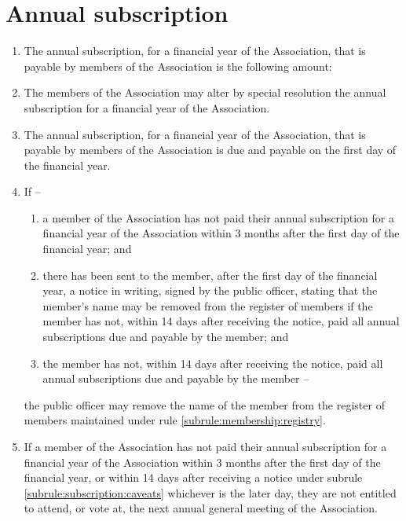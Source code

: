 \section{Annual subscription}
\label{rule:subscription}

\begin{enumerate}
	\item The annual subscription, for a financial year of the Association, that is payable by members of the Association is the following amount:\\\orgAnnualFee{}
	\item The members of the Association may alter by special resolution the annual subscription for a financial year of the Association.
	\item The annual subscription, for a financial year of the Association, that is payable by members of the Association is due and payable on the first day of the financial year.
	
	\item \label{subrule:subscription:caveats} If --
		\begin{enumerate}
			\item a member of the Association has not paid their annual subscription for a financial year of the Association within 3 months after the first day of the financial year; and
			\item there has been sent to the member, after the first day of the financial year, a notice in writing, signed by the public officer, stating that the member's name may be removed from the register of members if the member has not, within 14 days after receiving the notice, paid all annual subscriptions due and payable by the member; and
			\item the member has not, within 14 days after receiving the notice, paid all annual subscriptions due and payable by the member --
		\end{enumerate}	the public officer may remove the name of the member from the register of members maintained under rule \ref{subrule:membership:registry}.

	\item If a member of the Association has not paid their annual subscription for a financial year of the Association within 3 months after the first day of the financial year, or within 14 days after receiving a notice under subrule \ref{subrule:subscription:caveats} whichever is the later day, they are not entitled to attend, or vote at, the next annual general meeting of the Association.
\end{enumerate}